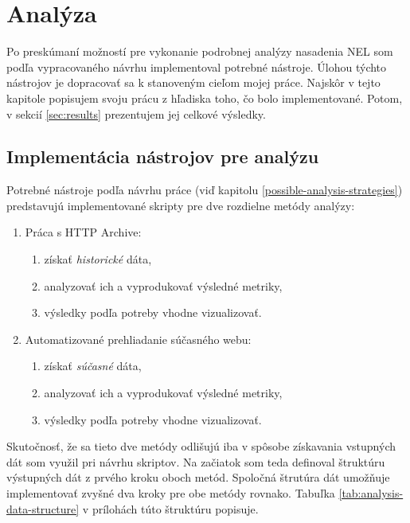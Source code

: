 \chapter{Analýza}

Po preskúmaní možností pre vykonanie podrobnej analýzy nasadenia NEL som podľa vypracovaného návrhu implementoval potrebné nástroje.
Úlohou týchto nástrojov je dopracovať sa k stanoveným cieľom mojej práce.  
Najskôr v tejto kapitole popisujem svoju prácu z hľadiska toho, čo bolo implementované.
Potom, v sekcií \ref{sec:results} prezentujem jej celkové výsledky.


\section{Implementácia nástrojov pre analýzu}

Potrebné nástroje podľa návrhu práce (viď kapitolu \ref{possible-analysis-strategies}) predstavujú implementované skripty pre dve rozdielne metódy analýzy:
\begin{enumerate}
    \item Práca s HTTP Archive:
    \begin{enumerate}
        \item získať \textit{historické} dáta, 
        \item analyzovať ich a vyprodukovať výsledné metriky,
        \item výsledky podľa potreby vhodne vizualizovať.
    \end{enumerate}

    \item Automatizované prehliadanie súčasného webu:
    \begin{enumerate}
        \item získať \textit{súčasné} dáta,
        \item analyzovať ich a vyprodukovať výsledné metriky, 
        \item výsledky podľa potreby vhodne vizualizovať.
    \end{enumerate}
\end{enumerate}

Skutočnosť, že sa tieto dve metódy odlišujú iba v spôsobe získavania vstupných dát som využil pri návrhu skriptov.
Na začiatok som teda definoval štruktúru výstupných dát z prvého kroku oboch metód.
Spoločná štrutúra dát umožňuje implementovať zvyšné dva kroky pre obe metódy rovnako.
Tabuľka \ref{tab:analysis-data-structure} v prílohách túto štruktúru popisuje. 

